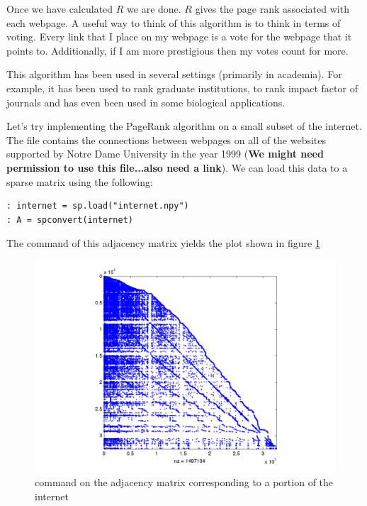 Once we have calculated $R$ we are done. $R$ gives the page rank associated with each webpage. A useful way to think of this algorithm is to think in terms of voting. Every link that I place on my webpage is a vote for the webpage that it points to. Additionally, if I am more prestigious then my votes count for more.

This algorithm has been used in several settings (primarily in academia). For example, it has been used to rank graduate institutions, to rank impact factor of journals and has even been used in some biological applications.

Let's try implementing the PageRank algorithm on a small subset of the internet. The file  contains the connections between webpages on all of the websites supported by Notre Dame University in the year 1999 ({\bf We might need permission to use this file...also need a link}). We can load this data to a sparse matrix using the following:


\begin{lstlisting}[style=python]
: internet = sp.load("internet.npy")
: A = spconvert(internet)
\end{lstlisting}
The  command of this adjacency matrix yields the plot shown in figure \ref{Fig:WebSparse}


\begin{figure}
\begin{center}
\includegraphics[scale = .4]{WebSparse.pdf}
\caption{ command on the adjacency matrix corresponding to a portion of the internet}
\label{Fig:WebSparse}
\end{center}
\end{figure}

